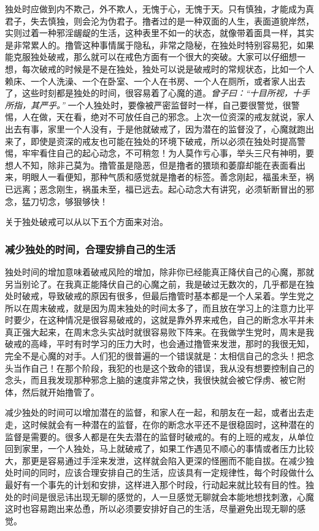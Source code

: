 独处时应做到内不欺己，外不欺人，无愧于心，无愧于天。只有慎独，才能成为真君子，失去慎独，则会沦为伪君子。撸者过的是一种双面的人生，表面道貌岸然，实则过着一种邪淫龌龊的生活，这种表里不如一的状态，就像带着面具一样，其实是非常累人的。撸管这种事情属于隐私，非常之隐秘，在独处时特别容易犯，如果能克服独处破戒，那么就可以在戒色方面有一个很大的突破。大家可以仔细想一想，每次破戒的时候是不是在独处，独处可以说是破戒时的常规状态，比如一个人赖床、一个人洗澡、一个在卧室、一个人在书房、一个人在厕所，或者家人出去了，这些时刻都是独处的时间，很容易着了心魔的道。\textit{曾子曰：“十目所视，十手所指，其严乎。”} 一个人独处时，要像被严密监督时一样，自己要很警觉，很警惕，人在做，天在看，绝对不可放任自己的邪念。上次一位资深的戒友就说，家人出去有事，家里一个人没有，于是他就破戒了，因为潜在的监督没了，心魔就跑出来了，即使是资深的戒友也可能在独处的环境下破戒，所以必须在独处时提高警惕，牢牢看住自己的起心动念，不可稍忽！为人莫作亏心事，举头三尺有神明，要想人不知，除非己莫为。撸管虽是隐恶，但是撸者的猥琐和萎靡却能在表面看出来，明眼人一看便知，那种气质和感觉就是撸者的标签。善念刚起，福虽未至，祸已远离；恶念刚生，祸虽未至，福已远去。起心动念大有讲究，必须斩断冒出的邪念，猛刀切念，够狠够快！

关于独处破戒可以从以下五个方面来对治。

\subsubsection{减少独处的时间，合理安排自己的生活}

独处时间的增加意味着破戒风险的增加，除非你已经能真正降伏自己的心魔，那就另当别论了。在我真正能降伏自己的心魔之前，我是破过无数次的，几乎都是在独处时破戒，导致破戒的原因有很多，但最后撸管时基本都是一个人呆着。学生党之所以在周末破戒，就是因为周末独处的时间太多了，而且放在学习上的注意力比平时要少，在这种情况是很容易破戒的，这就是靠外界来戒色，自己的断念水平并未真正强大起来，在周末念头实战时就很容易败下阵来。在我做学生党时，周末是我破戒的高峰，平时有时学习的压力大时，也会通过撸管来发泄，那时的我很无知，完全不是心魔的对手。人们犯的很普遍的一个错误就是：太相信自己的念头！把念头当作自己！在那个阶段，我犯的也是这个致命的错误，我从没有想要控制自己的念头，而且我发现那种邪念上脑的速度非常之快，我很快就会被它俘虏、被它附体，然后就开始撸管了。

减少独处的时间可以增加潜在的监督，和家人在一起，和朋友在一起，或者出去走走，这时候就会有一种潜在的监督，在你的断念水平还不是很稳固时，这种潜在的监督是需要的。很多人都是在失去潜在的监督时破戒的。有的上班的戒友，从单位回到家里，一个人独处，马上就破戒了，如果工作遇见不顺心的事情或者压力比较大，那更是容易通过手淫来发泄，这样就会陷入更深的怪圈而不能自拔。在减少独处时间的同时，应该合理安排自己的生活，应该具有一定规律性，每个时段做什么最好有一个事先的计划和安排，这样进入那个时段，行动起来就比较有目的性。独处的时间是很忌讳出现无聊的感觉的，人一旦感觉无聊就会本能地想找刺激，心魔这时也容易跑出来怂恿，所以必须要安排好自己的生活，尽量避免出现无聊的感觉。

